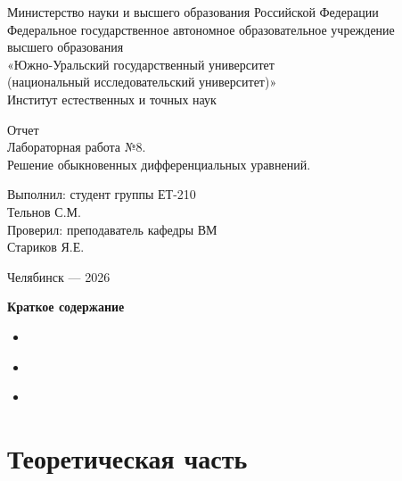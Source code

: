 \documentclass[a4paper]{article}
\begin{document}
\centering
Министерство науки и высшего образования Российской Федерации\\
Федеральное государственное автономное образовательное учреждение\\
высшего образования\\
«Южно-Уральский государственный университет\\
(национальный исследовательский университет)»\\
Институт естественных и точных наук

\setlength{\parskip}{7.5cm}

Отчет\\
Лабораторная работа №8.\\
Решение обыкновенных дифференциальных уравнений.

\setlength{\parskip}{6.5cm}

\raggedleft
\begin{minipage}{0.345\textwidth}
\raggedright
Выполнил: студент группы ЕТ-210\\
Тельнов С.М.\\
Проверил: преподаватель кафедры ВМ\\
Стариков Я.Е.
\end{minipage}

\setlength{\parskip}{6cm}

\centering
Челябинск — 2026

\setlength{\parskip}{0pt plus 1pt}
\newpage

\centering
\textbf{Краткое содержание}
\begin{itemize}
    \setlength{\parskip}{0.4cm}
    \item \hyperref[sec:theory]{ \dotfill \pageref{sec:theory}}
    \item \hyperref[sec:practice]{ \dotfill \pageref{sec:practice}}
    \item \hyperref[sec:conclusion]{ \dotfill \pageref{sec:conclusion}}
\end{itemize}

\setlength{\parindent}{1.5em}

\raggedright

\section*{\centering\fontsize{14pt}{0pt}\selectfont\textbf{Теоретическая часть}\label{sec:theory}}
\end{document}
